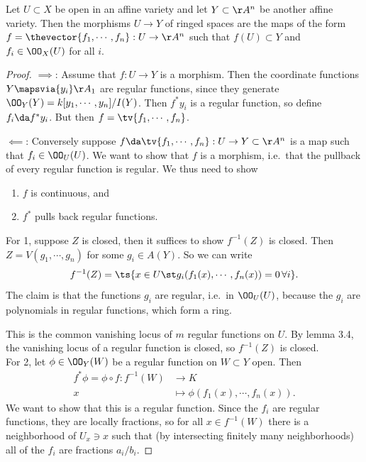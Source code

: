 \begin{proposition}[?]

Let \(U\subset X\) be open in an affine variety and let
\(Y\subset \AA^n\) be another affine variety. Then the morphisms
\(U\to Y\) of ringed spaces are the maps of the form
\(f = \thevector{f_1, \cdots, f_n}: U\to \AA^n\) such that
\(f(U) \subset Y\) and \(f_i \in \OO_X(U)\) for all \(i\).

\end{proposition}

\begin{proof}

\(\implies\): Assume that \(f: U\to Y\) is a morphism. Then the
coordinate functions \(Y\mapsvia{y_i} \AA_1\) are regular functions,
since they generate \(\OO_Y(Y) = k[y_1, \cdots, y_n]/I(Y)\). Then
\(f^* y_i\) is a regular function, so define \(f_i \da f^* y_i\). But
then \(f = \tv{f_1, \cdots, f_n}\).

\(\impliedby\): Conversely suppose
\(f \da \tv{f_1, \cdots, f_n}: U\to Y \subset \AA^n\) is a map such that
\(f_i \in \OO_U(U)\). We want to show that \(f\) is a morphism,
i.e.~that the pullback of every regular function is regular. We thus
need to show

\begin{enumerate}
\def\labelenumi{\arabic{enumi}.}
\tightlist
\item
  \(f\) is continuous, and
\item
  \(f^*\) pulls back regular functions.
\end{enumerate}

For 1, suppose \(Z\) is closed, then it suffices to show \(f^{-1} (Z)\)
is closed. Then \(Z = V(g_1, \cdots, g_n)\) for some \(g_i \in A(Y)\).
So we can write
\begin{align*}  
f^{-1} (Z) = \ts{
x\in U \st g_i(f_1(x), \cdots, f_n(x)  ) = 0\, \forall i
}
.\end{align*} The claim is that the functions \(g_i\) are regular,
i.e.~in \(\OO_U(U)\), because the \(g_i\) are polynomials in regular
functions, which form a ring.

This is the common vanishing locus of \(m\) regular functions on \(U\).
By lemma 3.4, the vanishing locus of a regular function is closed, so
\(f^{-1} (Z)\) is closed.\\

For 2, let \(\phi \in \OO_Y(W)\) be a regular function on \(W\subset Y\)
open. Then
\begin{align*}  
f^* \phi  = \phi \circ f: f^{-1} (W) &\to K \\
x &\mapsto \phi(f_1(x), \cdots, f_n(x))
.\end{align*} We want to show that this is a regular function. Since the
\(f_i\) are regular functions, they are locally fractions, so for all
\(x\in f^{-1} (W)\) there is a neighborhood of \(U_x\ni x\) such that
(by intersecting finitely many neighborhoods) all of the \(f_i\) are
fractions \(a_i/b_i\).


\end{proof}
